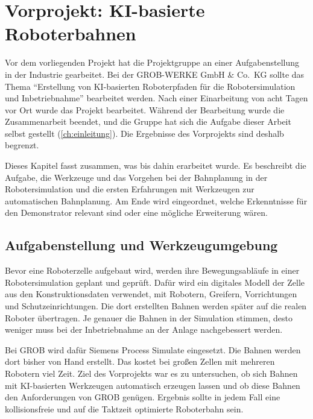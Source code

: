 \chapter{Vorprojekt: KI-basierte Roboterbahnen}
\label{ch:vorprojekt}

Vor dem vorliegenden Projekt hat die Projektgruppe an einer Aufgabenstellung in der Industrie
gearbeitet. Bei der GROB-WERKE GmbH \& Co.\ KG sollte das Thema \enquote{Erstellung von
KI-basierten Roboterpfaden für die Robotersimulation und Inbetriebnahme} bearbeitet werden. Nach
einer Einarbeitung von acht Tagen vor Ort wurde das Projekt bearbeitet. Während der Bearbeitung
wurde die Zusammenarbeit beendet, und die Gruppe hat sich die Aufgabe dieser Arbeit selbst
gestellt (\cref{ch:einleitung}). Die Ergebnisse des Vorprojekts sind deshalb begrenzt.

Dieses Kapitel fasst zusammen, was bis dahin erarbeitet wurde. Es beschreibt die Aufgabe, die
Werkzeuge und das Vorgehen bei der Bahnplanung in der Robotersimulation und die ersten
Erfahrungen mit Werkzeugen zur automatischen Bahnplanung. Am Ende wird eingeordnet, welche
Erkenntnisse für den Demonstrator relevant sind oder eine mögliche Erweiterung wären.

\section{Aufgabenstellung und Werkzeugumgebung}
\label{sec:vp-aufgabe}

Bevor eine Roboterzelle aufgebaut wird, werden ihre Bewegungsabläufe in einer
Robotersimulation geplant und geprüft. Dafür wird ein digitales Modell der Zelle aus den
Konstruktionsdaten verwendet, mit Robotern, Greifern, Vorrichtungen und Schutzeinrichtungen.
Die dort erstellten Bahnen werden später auf die realen Roboter übertragen. Je genauer die
Bahnen in der Simulation stimmen, desto weniger muss bei der Inbetriebnahme an der Anlage
nachgebessert werden.

Bei GROB wird dafür Siemens Process Simulate eingesetzt. Die Bahnen werden dort bisher von Hand
erstellt. Das kostet bei großen Zellen mit mehreren Robotern viel Zeit. Ziel des Vorprojekts war
es zu untersuchen, ob sich Bahnen mit KI-basierten Werkzeugen automatisch erzeugen lassen und
ob diese Bahnen den Anforderungen von GROB genügen. Ergebnis sollte in jedem Fall eine
kollisionsfreie und auf die Taktzeit optimierte Roboterbahn sein.

